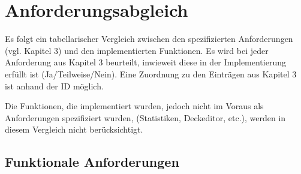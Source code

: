 \chapter{Anforderungsabgleich}
\label{cha:anforderungsabgleich}

Es folgt ein tabellarischer Vergleich zwischen den spezifizierten Anforderungen (vgl. Kapitel 3) und den implementierten Funktionen. Es wird bei jeder Anforderung aus Kapitel 3 beurteilt, inwieweit diese in der Implementierung erfüllt ist (Ja/Teilweise/Nein). Eine Zuordnung zu den Einträgen aus Kapitel 3 ist anhand der ID möglich.

Die Funktionen, die implementiert wurden, jedoch nicht im Voraus als Anforderungen spezifiziert wurden,  (Statistiken, Deckeditor, etc.), werden in diesem Vergleich nicht berücksichtigt.

\clearpage

\section{Funktionale Anforderungen}
\label{sec:anforderungsabgleich:funktional}

